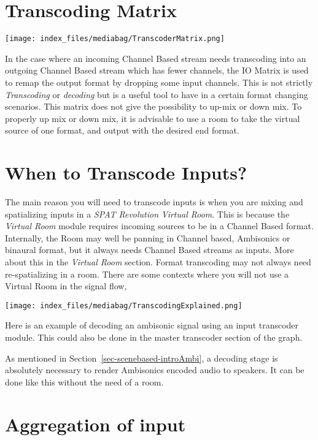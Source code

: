 \documentclass[
  letterpaper,
  DIV=11,
  numbers=noendperiod]{scrreport}
\begin{document}
\hypertarget{transcoding-matrix}{%
\section{Transcoding Matrix}\label{transcoding-matrix}}

\texttt{[image: index\_files/mediabag/TranscoderMatrix.png]}

In the case where an incoming Channel Based stream needs transcoding
into an outgoing Channel Based stream which has fewer channels, the IO
Matrix is used to remap the output format by dropping some input
channels. This is not strictly \emph{Transcoding} or \emph{decoding} but
is a useful tool to have in a certain format changing scenarios. This
matrix does not give the possibility to up-mix or down mix. To properly
up mix or down mix, it is advisable to use a room to take the virtual
source of one format, and output with the desired end format.

\hypertarget{when-to-transcode-inputs}{%
\section{When to Transcode Inputs?}\label{when-to-transcode-inputs}}

The main reason you will need to transcode inputs is when you are mixing
and spatializing inputs in a \emph{SPAT Revolution} \emph{Virtual Room}.
This is because the \emph{Virtual Room} module requires incoming sources
to be in a Channel Based format. Internally, the Room may well be
panning in Channel based, Ambisonics or binaural format, but it always
needs Channel Based streams as inputs. More about this in the
\emph{Virtual Room} section. Format transcoding may not always need
re-spatializing in a room. There are some contexts where you will not
use a Virtual Room in the signal flow,

\texttt{[image: index\_files/mediabag/TranscodingExplained.png]}

Here is an example of decoding an ambisonic signal using an input
transcoder module. This could also be done in the master transcoder
section of the graph.

As mentioned in Section~\ref{sec-scenebased-introAmbi}, a decoding stage
is absolutely necessary to render Ambisonics encoded audio to speakers.
It can be done like this without the need of a room.

\hypertarget{aggregation-of-input}{%
\section{Aggregation of input}\label{aggregation-of-input}}
\end{document}
